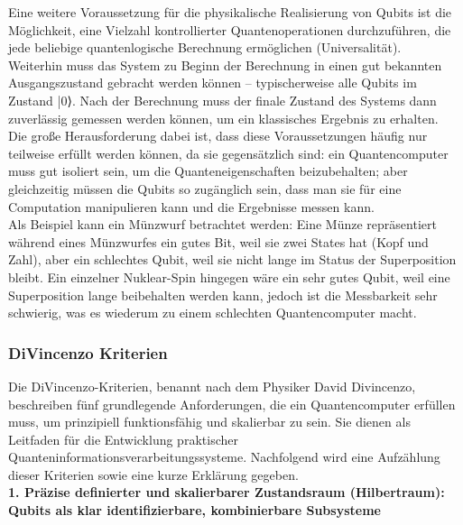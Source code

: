  Eine weitere Voraussetzung für die physikalische Realisierung von Qubits ist die Möglichkeit, eine Vielzahl kontrollierter Quantenoperationen durchzuführen, die jede beliebige quantenlogische Berechnung ermöglichen (Universalität).\\
 
 Weiterhin  muss das System zu Beginn der Berechnung in einen gut bekannten Ausgangszustand gebracht werden können – typischerweise alle Qubits im Zustand |0⟩. Nach der Berechnung muss der finale Zustand des Systems dann zuverlässig gemessen werden können, um ein klassisches Ergebnis zu erhalten. \\

Die große Herausforderung dabei ist, dass diese Voraussetzungen häufig nur teilweise erfüllt werden können, da sie gegensätzlich sind: ein Quantencomputer muss gut isoliert sein, um die Quanteneigenschaften beizubehalten; aber gleichzeitig müssen die Qubits so zugänglich sein, dass man sie für eine Computation manipulieren kann und die Ergebnisse messen kann. \\
Als Beispiel kann ein Münzwurf betrachtet werden: Eine Münze repräsentiert während eines Münzwurfes ein gutes Bit, weil sie zwei States hat (Kopf und Zahl), aber ein schlechtes Qubit, weil sie nicht lange im Status der Superposition bleibt. Ein einzelner Nuklear-Spin hingegen wäre ein sehr gutes Qubit, weil eine Superposition lange beibehalten werden kann, jedoch ist die Messbarkeit sehr schwierig, was es wiederum zu einem schlechten Quantencomputer macht.  \\

\cite{nielsen_michael_a_and_isaac_l_chuang_quantum_2010}

\subsubsection{DiVincenzo Kriterien}

Die DiVincenzo-Kriterien, benannt nach dem Physiker David Divincenzo, beschreiben fünf grundlegende Anforderungen, die ein Quantencomputer erfüllen muss, um prinzipiell funktionsfähig und skalierbar zu sein. Sie dienen als Leitfaden für die Entwicklung praktischer Quanteninformationsverarbeitungssysteme. Nachfolgend wird eine Aufzählung dieser Kriterien sowie eine kurze Erklärung gegeben. \\

\textbf{1. Präzise definierter und skalierbarer Zustandsraum (Hilbertraum): Qubits als klar identifizierbare, kombinierbare Subsysteme} 

